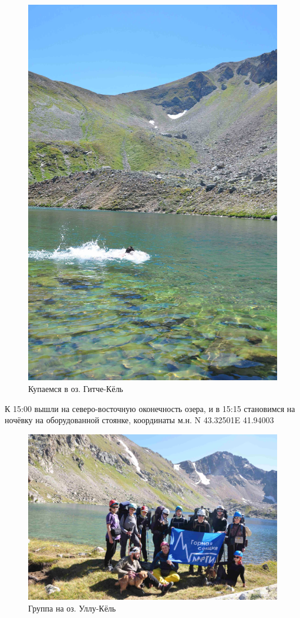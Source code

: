 \begin{figure}[h!]
	\centering
	\begin{turn}{0}
		\includegraphics[width=0.7\linewidth]{../pics/DSC_0774}
	\end{turn}
	\caption{Купаемся в оз. Гитче-Кёль}
	\label{fig:DSC_0774}
\end{figure}

К 15:00 вышли на северо-восточную оконечность озера, и в 15:15 становимся на ночёвку на оборудованной стоянке, координаты м.н. N 43.32501\degree E 41.94003\degree

\begin{figure}[h!]
	\centering
	\includegraphics[width=0.7\linewidth]{../pics/DSC_0800}
	\caption{Группа на оз. Уллу-Кёль}
	\label{fig:DSC_0800}
\end{figure}


